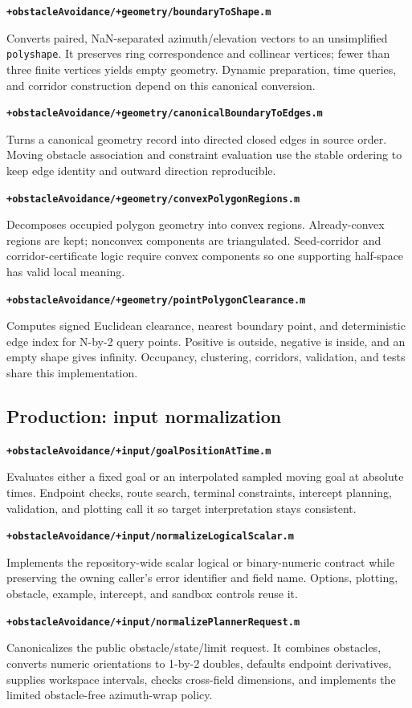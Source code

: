 \documentclass[10pt,letterpaper]{article}
\newcommand{\file}[1]{\nolinkurl{#1}}
\newcommand{\scriptentry}[2]{%
  \par\medskip\noindent\textbf{\file{#1}}\par
  \begingroup\raggedright #2\par\endgroup
}
\begin{document}
\scriptentry{+obstacleAvoidance/+geometry/boundaryToShape.m}{Converts paired,
NaN-separated azimuth/elevation vectors to an unsimplified \file{polyshape}.
It preserves ring correspondence and collinear vertices; fewer than three
finite vertices yields empty geometry. Dynamic preparation, time queries, and
corridor construction depend on this canonical conversion.}

\scriptentry{+obstacleAvoidance/+geometry/canonicalBoundaryToEdges.m}{Turns a
canonical geometry record into directed closed edges in source order. Moving
obstacle association and constraint evaluation use the stable ordering to keep
edge identity and outward direction reproducible.}

\scriptentry{+obstacleAvoidance/+geometry/convexPolygonRegions.m}{Decomposes
occupied polygon geometry into convex regions. Already-convex regions are kept;
nonconvex components are triangulated. Seed-corridor and corridor-certificate
logic require convex components so one supporting half-space has valid local
meaning.}

\scriptentry{+obstacleAvoidance/+geometry/pointPolygonClearance.m}{Computes
signed Euclidean clearance, nearest boundary point, and deterministic edge
index for N-by-2 query points. Positive is outside, negative is inside, and an
empty shape gives infinity. Occupancy, clustering, corridors, validation, and
tests share this implementation.}

\subsection{Production: input normalization}

\scriptentry{+obstacleAvoidance/+input/goalPositionAtTime.m}{Evaluates either a
fixed goal or an interpolated sampled moving goal at absolute times. Endpoint
checks, route search, terminal constraints, intercept planning, validation, and
plotting call it so target interpretation stays consistent.}

\scriptentry{+obstacleAvoidance/+input/normalizeLogicalScalar.m}{Implements the
repository-wide scalar logical or binary-numeric contract while preserving the
owning caller's error identifier and field name. Options, plotting, obstacle,
example, intercept, and sandbox controls reuse it.}

\scriptentry{+obstacleAvoidance/+input/normalizePlannerRequest.m}{Canonicalizes
the public obstacle/state/limit request. It combines obstacles, converts numeric
orientations to 1-by-2 doubles, defaults endpoint derivatives, supplies
workspace intervals, checks cross-field dimensions, and implements the limited
obstacle-free azimuth-wrap policy.}
\end{document}
